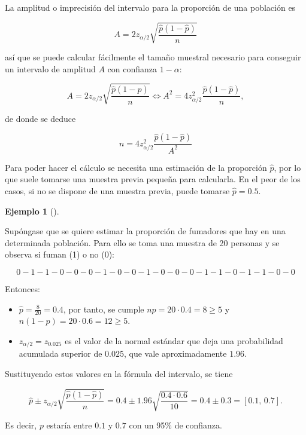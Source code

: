 \documentclass[
  a4paper,
]{scrreport}
\providecommand{\tightlist}{%
  \setlength{\itemsep}{0pt}\setlength{\parskip}{0pt}}\usepackage{longtable,booktabs,array}
\theoremstyle{plain}
\theoremstyle{definition}
\newtheorem{example}{Ejemplo}[chapter]
\theoremstyle{definition}
\theoremstyle{remark}
\begin{document}
La amplitud o imprecisión del intervalo para la proporción de una
población es

\[
A= 2 z_{\alpha/2}\sqrt{\frac{\hat{p}(1-\hat{p})}{n}}
\]

así que se puede calcular fácilmente el tamaño muestral necesario para
conseguir un intervalo de amplitud \(A\) con confianza \(1-\alpha\):

\[
A= 2 z_{\alpha/2}\sqrt{\frac{\hat{p}(1-\hat{p})}{n}} \Leftrightarrow A^2= 4 z_{\alpha/2}^2\frac{\hat{p}(1-\hat{p})}{n},
\]

de donde se deduce

\[
{n= 4 z_{\alpha/2}^2\frac{\hat{p}(1-\hat{p})}{A^2}}
\]

Para poder hacer el cálculo se necesita una estimación de la proporción
\(\hat{p}\), por lo que suele tomarse una muestra previa pequeña para
calcularla. En el peor de los casos, si no se dispone de una muestra
previa, puede tomarse \(\hat{p}=0.5\).

\begin{example}[]\protect\hypertarget{exm-intervalo-confianza-proporcion}{}\label{exm-intervalo-confianza-proporcion}

Supóngase que se quiere estimar la proporción de fumadores que hay en
una determinada población. Para ello se toma una muestra de 20 personas
y se observa si fuman (1) o no (0):

\[
0 - 1 - 1 - 0 - 0 - 0 - 1 - 0 - 0 - 1 - 0 - 0 - 0 - 1 - 1- 0 - 1 - 1 - 0 - 0
\]

Entonces:

\begin{itemize}
\tightlist
\item
  \(\hat p=\frac{8}{20}=0.4\), por tanto, se cumple
  \(np=20\cdot 0.4 = 8\geq 5\) y \(n(1-p)=20\cdot 0.6= 12\geq 5\).
\item
  \(z_{\alpha/2}=z_{0.025}\) es el valor de la normal estándar que deja
  una probabilidad acumulada superior de \(0.025\), que vale
  aproximadamente \(1.96\).
\end{itemize}

Sustituyendo estos valores en la fórmula del intervalo, se tiene

\[
\hat{p}\pm z_{\alpha/2}\sqrt{\frac{\hat{p}(1-\hat{p})}{n}} = 0.4\pm 1.96\sqrt{\frac{0.4\cdot 0.6}{10}} = 0.4\pm  0.3 = \left[0.1,\,0.7\right].
\]

Es decir, \(p\) estaría entre \(0.1\) y \(0.7\) con un 95\% de
confianza.

\end{example}
\end{document}
